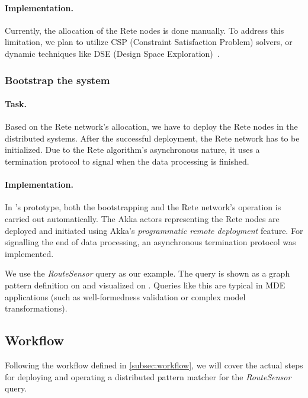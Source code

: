 \paragraph{Implementation.} Currently, the allocation of the Rete nodes is done manually. To address this limitation, we plan to utilize CSP (Constraint Satisfaction Problem) solvers, or dynamic techniques like DSE (Design Space Exploration)~\cite{DSE11}. 

\subsubsection{Bootstrap the system}

\paragraph{Task.} Based on the Rete network's allocation, we have to deploy the Rete nodes in the distributed systems. After the successful deployment, the Rete network has to be initialized. Due to the Rete algorithm's asynchronous nature, it uses a termination protocol to signal when the data processing is finished. 

\paragraph{Implementation.} In \iqd{}'s prototype, both the bootstrapping and the Rete network's operation is carried out automatically. The Akka actors representing the Rete nodes are deployed and initiated using Akka's \textit{programmatic remote deployment} feature. For signalling the end of data processing, an asynchronous termination protocol was implemented. 





We use the \textit{RouteSensor} query as our example. The query is shown as a graph pattern definition on  and visualized on . Queries like this are typical in MDE applications (such as well-formedness validation or complex model transformations).

\subsection{Workflow}

Following the workflow defined in \autoref{subsec:workflow}, we will cover the actual steps for deploying and operating a distributed pattern matcher for the \textit{RouteSensor} query.

